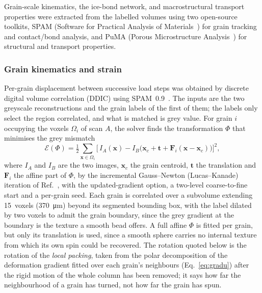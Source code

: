 \documentclass[preprint,12pt,numbers]{elsarticle}
\begin{document}
  Grain-scale kinematics, the ice-bond network, and macrostructural transport
  properties were extracted from the labelled volumes using two open-source
  toolkits, SPAM (Software for Practical Analysis of
  Materials~\cite{Stamati2020}) for grain tracking and contact/bond analysis,
  and PuMA (Porous Microstructure Analysis~\cite{Ferguson2021}) for structural
  and transport properties.

  \subsubsection{Grain kinematics and strain}
  \label{sec:ddic}
  \label{sec:sandtrack}
  \label{sec:sandstrain}
  Per-grain displacement between successive load steps was obtained by discrete
  digital volume correlation (DDIC) using SPAM~0.9~\cite{Stamati2020}.  The
  inputs are the two greyscale reconstructions and the grain labels of the
  first of them; the labels only select the region correlated, and what is
  matched is grey value.  For grain $i$ occupying the voxels $\Omega_i$ of
  scan $A$, the solver finds the transformation $\Phi$ that minimises the
  grey mismatch
  \begin{equation}
    \mathcal{E}(\Phi) = \tfrac12 \sum_{\mathbf{x}\in\Omega_i}
      \bigl[\, I_A(\mathbf{x}) - I_B\bigl(\mathbf{x}_c + \mathbf{t}
      + \mathbf{F}_i(\mathbf{x}-\mathbf{x}_c)\bigr) \bigr]^2 ,
    \label{eq:ddic}
  \end{equation}
  where $I_A$ and $I_B$ are the two images, $\mathbf{x}_c$ the grain centroid,
  $\mathbf{t}$ the translation and $\mathbf{F}_i$ the affine part of $\Phi$,
  by the incremental Gauss--Newton (Lucas--Kanade) iteration of
  Ref.~\cite{Stamati2020}, with the updated-gradient option, a two-level
  coarse-to-fine start and a per-grain seed.  Each grain is correlated over a
  subvolume extending 15~voxels (\SI{370}{\micro\meter}) beyond its segmented
  bounding box, with the label dilated by two voxels to admit the grain
  boundary, since the grey gradient at the boundary is the texture a smooth
  bead offers.  A full affine $\Phi$ is fitted per grain, but only its
  translation is used,
  since a smooth sphere carries no internal texture from which its own spin
  could be recovered.  The rotation quoted below is the rotation of the
  \emph{local packing}, taken from the polar decomposition of the deformation
  gradient fitted over each grain's neighbours (Eq.~\eqref{eq:gradu}) after
  the rigid motion of the whole column has been removed; it says how far the
  neighbourhood of a grain has turned, not how far the grain has spun.
\end{document}
